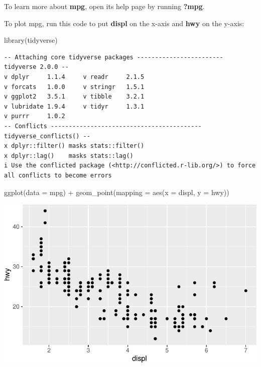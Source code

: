 \documentclass[
  letterpaper,
  DIV=11,
  numbers=noendperiod]{scrreprt}
\newenvironment{Shaded}{\begin{snugshade}}{\end{snugshade}}
\newcommand{\AttributeTok}[1]{\textcolor[rgb]{0.40,0.45,0.13}{#1}}
\newcommand{\FunctionTok}[1]{\textcolor[rgb]{0.28,0.35,0.67}{#1}}
\newcommand{\NormalTok}[1]{\textcolor[rgb]{0.00,0.23,0.31}{#1}}
\newcommand{\SpecialCharTok}[1]{\textcolor[rgb]{0.37,0.37,0.37}{#1}}
\begin{document}
To learn more about \textbf{mpg}, open its help page by running
\textbf{?mpg}.

To plot mpg, run this code to put \textbf{displ} on the x-axis and
\textbf{hwy} on the y-axis:

\begin{Shaded}
\begin{Highlighting}[]
\FunctionTok{library}\NormalTok{(tidyverse)}
\end{Highlighting}
\end{Shaded}

\begin{verbatim}
-- Attaching core tidyverse packages ------------------------ tidyverse 2.0.0 --
v dplyr     1.1.4     v readr     2.1.5
v forcats   1.0.0     v stringr   1.5.1
v ggplot2   3.5.1     v tibble    3.2.1
v lubridate 1.9.4     v tidyr     1.3.1
v purrr     1.0.2     
-- Conflicts ------------------------------------------ tidyverse_conflicts() --
x dplyr::filter() masks stats::filter()
x dplyr::lag()    masks stats::lag()
i Use the conflicted package (<http://conflicted.r-lib.org/>) to force all conflicts to become errors
\end{verbatim}

\begin{Shaded}
\begin{Highlighting}[]
\FunctionTok{ggplot}\NormalTok{(}\AttributeTok{data =}\NormalTok{ mpg) }\SpecialCharTok{+} 
  \FunctionTok{geom\_point}\NormalTok{(}\AttributeTok{mapping =} \FunctionTok{aes}\NormalTok{(}\AttributeTok{x =}\NormalTok{ displ, }\AttributeTok{y =}\NormalTok{ hwy))}
\end{Highlighting}
\end{Shaded}

\includegraphics{Beginning_Data_Visualization_files/figure-pdf/Example1-1.pdf}
\end{document}
